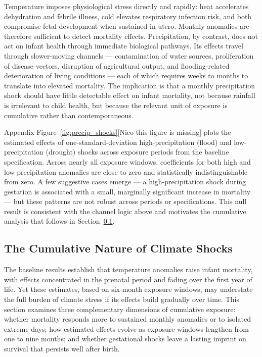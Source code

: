 \documentclass[a4paper]{article}
\begin{document}
Temperature imposes physiological stress directly and rapidly: heat accelerates dehydration and febrile illness, cold elevates respiratory infection risk, and both compromise fetal development when sustained in utero. Monthly anomalies are therefore sufficient to detect mortality effects. Precipitation, by contrast, does not act on infant health through immediate biological pathways. Its effects travel through slower-moving channels — contamination of water sources, proliferation of disease vectors, disruption of agricultural output, and flooding-related deterioration of living conditions — each of which requires weeks to months to translate into elevated mortality. The implication is that a monthly precipitation shock should have little detectable effect on infant mortality, not because rainfall is irrelevant to child health, but because the relevant unit of exposure is cumulative rather than contemporaneous.

Appendix Figure~\ref{fig:precip_shocks}[Nico this figure is missing] plots the estimated effects of one-standard-deviation high-precipitation (flood) and low-precipitation (drought) shocks across exposure periods from the baseline specification. Across nearly all exposure windows, coefficients for both high and low precipitation anomalies are close to zero and statistically indistinguishable from zero. A few suggestive cases emerge — a high-precipitation shock during gestation is associated with a small, marginally significant increase in mortality — but these patterns are not robust across periods or specifications. This null result is consistent with the channel logic above and motivates the cumulative analysis that follows in Section~\ref{sec:results_cumulative}.

\subsection{The Cumulative Nature of Climate Shocks} \label{sec:results_cumulative}

The baseline results establish that temperature anomalies raise infant mortality, with effects concentrated in the prenatal period and fading over the first year of life. Yet these estimates, based on six-month exposure windows, may understate the full burden of climate stress if its effects build gradually over time. This section examines three complementary dimensions of cumulative exposure: whether mortality responds more to sustained monthly anomalies or to isolated extreme days; how estimated effects evolve as exposure windows lengthen from one to nine months; and whether gestational shocks leave a lasting imprint on survival that persists well after birth.
\end{document}
